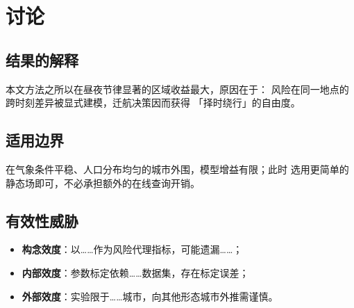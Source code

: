 
\section{讨论}
\label{sec:discussion}

\subsection{结果的解释}

本文方法之所以在昼夜节律显著的区域收益最大，原因在于：
风险在同一地点的跨时刻差异被显式建模，迁航决策因而获得
「择时绕行」的自由度。

\subsection{适用边界}

在气象条件平稳、人口分布均匀的城市外围，模型增益有限；此时
选用更简单的静态场即可，不必承担额外的在线查询开销。

\subsection{有效性威胁}

\begin{itemize}
  \item \textbf{构念效度}：以……作为风险代理指标，可能遗漏……；
  \item \textbf{内部效度}：参数标定依赖……数据集，存在标定误差；
  \item \textbf{外部效度}：实验限于……城市，向其他形态城市外推需谨慎。
\end{itemize}
